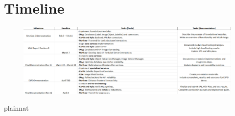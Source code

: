\documentclass[12pt, titlepage]{article}
\begin{document}
\section{Timeline}

\begin{figure}[H]
  \centering
  \includegraphics[width=1\textwidth]{timeline.png}
  \label{FigUH}
\end{figure}

 {plainnat}


\newpage{}
\end{document}
